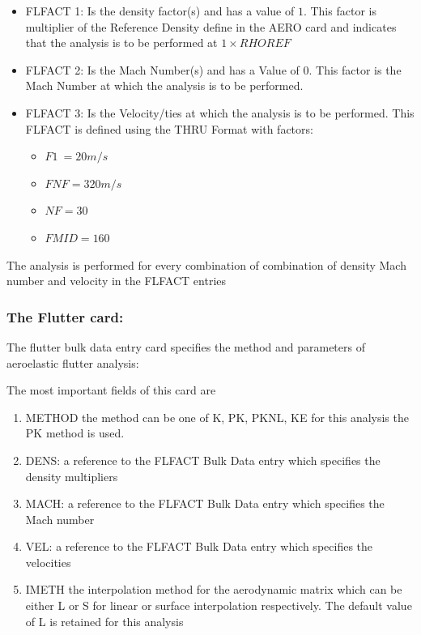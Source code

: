 \begin{itemize}
\item
  FLFACT 1: Is the density factor(s) and has a value of \(1\). This
  factor is multiplier of the Reference Density define in the AERO card
  and indicates that the analysis is to be performed at
  \(1 \times RHOREF\)
\item
  FLFACT 2: Is the Mach Number(s) and has a Value of \(0\). This factor
  is the Mach Number at which the analysis is to be performed.
\item
  FLFACT 3: Is the Velocity/ties at which the analysis is to be
  performed. This FLFACT is defined using the THRU Format with factors:

  \begin{itemize}
  \item
    \(F1\  = 20m/s\)
  \item
    \(FNF = 320m/s\)
  \item
    \(NF = 30\)
  \item
    \(FMID = 160\)
  \end{itemize}
\end{itemize}

The analysis is performed for every combination of combination of
density Mach number and velocity in the FLFACT entries

\subsubsection{The Flutter card:}

The flutter bulk data entry card specifies the method and parameters of
aeroelastic flutter analysis:

The most important fields of this card are

\begin{enumerate}
\def\labelenumi{\arabic{enumi}.}
\item
  METHOD the method can be one of K, PK, PKNL, KE for this analysis the
  PK method is used.
\item
  DENS: a reference to the FLFACT Bulk Data entry which specifies the
  density multipliers
\item
  MACH: a reference to the FLFACT Bulk Data entry which specifies the
  Mach number
\item
  VEL: a reference to the FLFACT Bulk Data entry which specifies the
  velocities
\item
  IMETH the interpolation method for the aerodynamic matrix which can be
  either L or S for linear or surface interpolation respectively. The
  default value of L is retained for this analysis
\end{enumerate}


